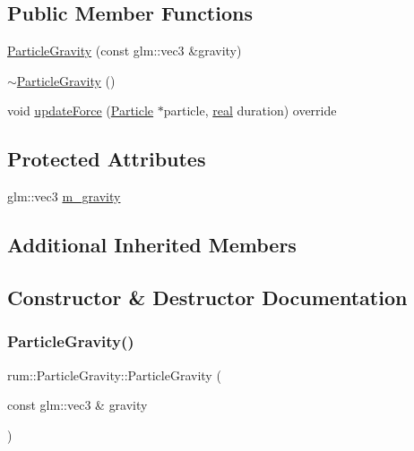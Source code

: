 \subsection*{Public Member Functions}
\begin{DoxyCompactItemize}
\item 
\mbox{\hyperlink{classrum_1_1_particle_gravity_af489016667073103233d0703ab2efbaa}{Particle\+Gravity}} (const glm\+::vec3 \&gravity)
\item 
\mbox{\hyperlink{classrum_1_1_particle_gravity_a4c09cee665172d402c6c545a3f9119ce}{$\sim$\+Particle\+Gravity}} ()
\item 
void \mbox{\hyperlink{classrum_1_1_particle_gravity_a52871a283cfef5377ef493bed81954a7}{update\+Force}} (\mbox{\hyperlink{classrum_1_1_particle}{Particle}} $\ast$particle, \mbox{\hyperlink{namespacerum_a7e8cca23573d5eaead0f138cbaa4862c}{real}} duration) override
\end{DoxyCompactItemize}
\subsection*{Protected Attributes}
\begin{DoxyCompactItemize}
\item 
glm\+::vec3 \mbox{\hyperlink{classrum_1_1_particle_gravity_a9fbc86ccd5d18e93626a6c4b0fc3b5e2}{m\+\_\+gravity}}
\end{DoxyCompactItemize}
\subsection*{Additional Inherited Members}


\subsection{Constructor \& Destructor Documentation}
\mbox{\label{classrum_1_1_particle_gravity_af489016667073103233d0703ab2efbaa}} 
\subsubsection{\texorpdfstring{Particle\+Gravity()}{ParticleGravity()}}
{\footnotesize\ttfamily rum\+::\+Particle\+Gravity\+::\+Particle\+Gravity (\begin{DoxyParamCaption}\item[{const glm\+::vec3 \&}]{gravity }\end{DoxyParamCaption})\hspace{0.3cm}{\ttfamily [explicit]}}

